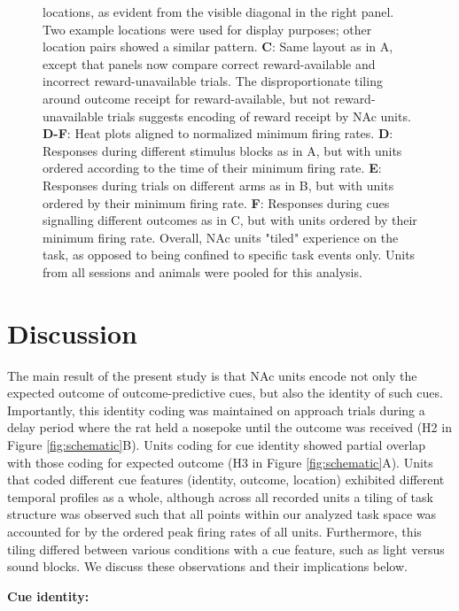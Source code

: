 \documentclass[11pt]{article}
\newcommand{\bsf}[1]{\textbf{#1}}
\begin{document}
{\begin{figure}[h]
{locations, as evident from the visible diagonal in the right panel. Two
example locations were used for display purposes; other location pairs showed
a similar pattern. \bsf{C}: Same layout as in A, except that panels now compare
correct reward-available and incorrect reward-unavailable trials. The disproportionate tiling around outcome receipt for reward-available, but not reward-unavailable
trials suggests encoding of reward receipt by NAc units. \bsf{D-F}: Heat plots aligned to normalized minimum firing rates. \bsf{D}: Responses during different stimulus blocks as in A, but with units ordered according to
the time of their minimum firing rate. \bsf{E}: Responses during trials on different arms as in B, but with units ordered by their minimum
firing rate. \bsf{F}: Responses during cues signalling different outcomes as in C, but with units ordered by their minimum firing
rate. Overall, NAc units "tiled" experience on the task, as opposed to being
confined to specific task events only. Units from all sessions and animals
were pooled for this analysis.}
\label{fig:NP_tiling}
\end{figure}

\section*{Discussion}

The main result of the present study is that NAc units encode not
only the expected outcome of outcome-predictive cues, but also the
identity of such cues. Importantly, this identity coding was
maintained on approach trials during a delay period where the rat held
a nosepoke until the outcome was received (H2 in Figure
\ref{fig:schematic}B). Units coding for cue identity showed partial
overlap with those coding for expected outcome (H3 in Figure
\ref{fig:schematic}A). Units that coded different cue features
(identity, outcome, location) exhibited different temporal profiles as
a whole, although across all recorded units a tiling of task structure
was observed such that all points within our analyzed task space was
accounted for by the ordered peak firing rates of all
units. Furthermore, this tiling differed between various conditions
with a cue feature, such as light versus sound blocks. We discuss
these observations and their implications below.

{\bf Cue identity:}

}
\end{document}
